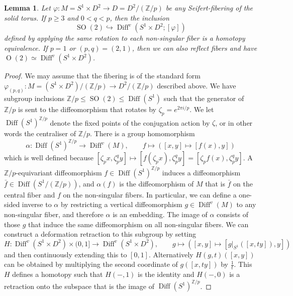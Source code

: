 \documentclass{amsart}
\theoremstyle{plain}
\newtheorem{lem}[thm]{Lemma}
\theoremstyle{definition}
\DeclareMathOperator\Diff{Diff}
\DeclareMathOperator\SO{SO}
\DeclareMathOperator\Or{O}
\newcommand{\bbZ}{\mathbb{Z}}
\begin{document}
\begin{lem}\label{lem:Diffv-solid-torus}
    Let $\varphi\colon M = S^1 \times D^2 \to D = D^2/(\bbZ/p)$ be any Seifert-fibering of the solid torus.
    If $p\ge 3$ and $0<q<p$, then the inclusion
    \[
        \SO(2) \hookrightarrow \Diff^v(S^1 \times D^2; [\varphi])
    \]
    defined by applying the same rotation to each non-singular fiber is a homotopy equivalence.
    If $p=1$ or $(p,q) = (2,1)$, then we can also reflect fibers and have $\Or(2) \simeq \Diff^v(S^1 \times D^2)$.
\end{lem}
\begin{proof}
    We may assume that the fibering is of the standard form $\varphi_{(p,q)} \colon M = (S^1 \times D^2)/(\bbZ/p) \to D^2/(\bbZ/p)$ described above.
    We have subgroup inclusions $\bbZ/p \le \SO(2) \le \Diff(S^1)$ such that the generator of $\bbZ/p$ is sent to the diffeomorphism that rotates by $\zeta_p = e^{2\pi i/p}$.
    We let $\Diff(S^1)^{\bbZ/p}$ denote the fixed points of the conjugation action by $\zeta$, or in other words the centraliser of $\bbZ/p$.
    There is a group homomorphism
    \[
        \alpha\colon \Diff(S^1)^{\bbZ/p} \longrightarrow \Diff^v(M), \qquad
        f \longmapsto \left( [x, y] \mapsto [f(x), y]\right)
    \]
    which is well defined because $[\zeta_p x, \zeta_p^q y] \mapsto [f(\zeta_p x), \zeta_p^q y] = [\zeta_p f(x), \zeta_p^q y]$.
    A $\bbZ/p$-equivariant diffeomorphism $f \in \Diff(S^1)^{\bbZ/p}$ induces a diffeomorphism $\bar{f} \in \Diff(S^1/(\bbZ/p))$, 
    and $\alpha(f)$ is the diffeomorphism of $M$ that is $\bar{f}$ on the central fiber and $f$ on the non-singular fibers.
    In particular, we can define a one-sided inverse to $\alpha$ by restricting a vertical diffeomorphism $g \in \Diff^v(M)$ to any non-singular fiber, and therefore $\alpha$ is an embedding.
    The image of $\alpha$ consists of those $g$ that induce the same diffeomorphism on all non-singular fibers.
    We can construct a deformation retraction to this subgroup by setting
    \[
        H\colon \Diff^v(S^1 \times D^2) \times (0,1] \longrightarrow \Diff^v(S^1 \times D^2), \qquad
        g \longmapsto \left( [x,y] \mapsto [g|_{S^1}([x,ty]), y]\right)
    \]
    and then continuously extending this to $[0,1]$.
    Alternatively $H(g, t)([x,y])$ can be obtained by multiplying the second coordinate of $g([x,ty])$ by $\tfrac{1}{t}$.
    This $H$ defines a homotopy such that $H(-,1)$ is the identity and $H(-,0)$ is a retraction onto the subspace that is the image of $\Diff(S^1)^{\bbZ/p}$.
    

\end{proof}
\end{document}
